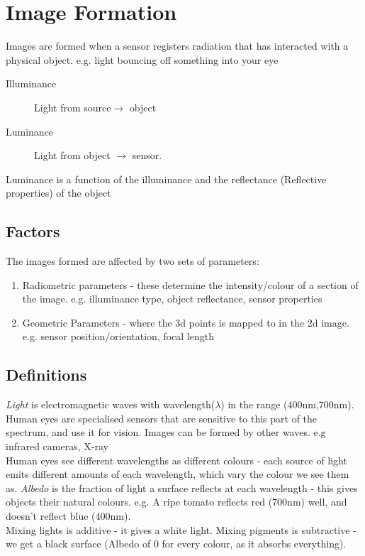 \section{Image Formation}
Images are formed when a sensor registers radiation that has interacted with a physical object. e.g. light bouncing off something into your eye

\begin{description}
    \item[Illuminance] Light from source$\rightarrow$ object
    \item[Luminance] Light from object $\rightarrow$ sensor. 
\end{description}
Luminance is a function of the illuminance and the reflectance (Reflective properties) of the object

\subsection{Factors}
The images formed are affected by two sets of parameters:
\begin{enumerate}
    \item Radiometric parameters - these determine the intensity/colour of a section of the image. e.g. illuminance type, object reflectance, sensor properties
    \item Geometric Parameters - where the 3d points is mapped to in the 2d image. e.g. sensor position/orientation, focal length
\end{enumerate}

\subsection{Definitions}
\emph{Light} is electromagnetic waves with wavelength($\lambda$) in the range (400nm,700nm). Human eyes are specialised sensors that are sensitive to this part of the spectrum, and use it for vision. Images can be formed by other waves. e.g infrared cameras, X-ray\\

Human eyes see different wavelengths as different colours - each source of light emits different amounts of each wavelength, which vary the colour we see them as. \emph{Albedo} is the fraction of light a surface reflects at each wavelength - this gives objects their natural colours. e.g. A ripe tomato reflects red (700nm) well, and doesn't reflect blue (400nm). \\

Mixing lights is additive - it gives a white light. Mixing pigments is subtractive - we get a black surface (Albedo of 0 for every colour, as it absorbs everything). \\

